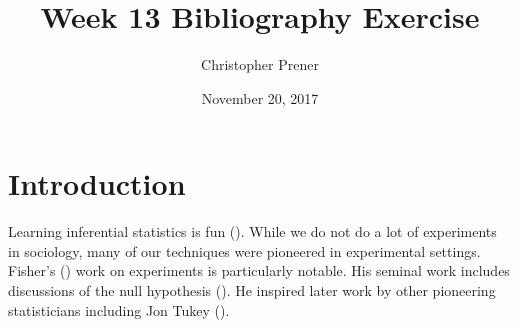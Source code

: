 \documentclass{article}
\title{Week 13 Bibliography Exercise}
\author{Christopher Prener}
\date{November 20, 2017}
\begin{document}
\maketitle

\section{Introduction}
Learning inferential statistics is fun (\cite{fisher1937design}). While we do not do a lot of experiments in sociology, many of our techniques were pioneered in experimental settings. Fisher's (\cite*{fisher1937design}) work on experiments is particularly notable. His seminal work includes discussions of the null hypothesis (\cite[15--17]{fisher1937design}). He inspired later work by other pioneering statisticians including Jon Tukey (\cite{mcgill1978variations, tukey1962future}).

\printbibliography
\end{document}
